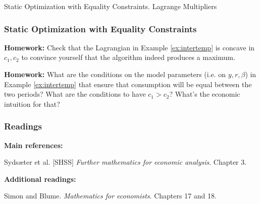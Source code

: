 \documentclass[10pt]{beamer}
\theoremstyle{definition}
\begin{document}
\begin{section}{Static Optimization with Equality Constraints. Lagrange Multipliers}
\begin{frame}[fragile]
\frametitle{Static Optimization with Equality Constraints}
\textbf{Homework:} Check that the Lagrangian in Example \ref{ex:intertemp} is concave in $ c_1,c_2 $ to convince yourself that the algorithm indeed produces a maximum. \bigskip

\textbf{Homework:} What are the conditions on the model parameters (i.e. on $ y,r,\beta $) in Example \ref{ex:intertemp} that ensure that consumption will be equal between the two periods? What are the conditions to have $ c_1 > c_2 $? What's the economic intuition for that?
\end{frame}

\end{section}

\begin{frame}[fragile]
\frametitle{Readings}
\textbf{Main references:}

Syds\ae{}ter et al. [SHSS] \emph{Further mathematics for economic analysis}. Chapter 3.\bigskip

\textbf{Additional readings:}

Simon and Blume. \emph{Mathematics for economists}. Chapters 17 and 18.
\end{frame}
\end{document}
